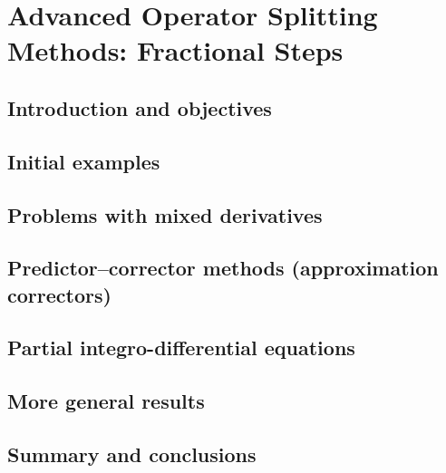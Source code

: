 \chapter{Advanced Operator Splitting Methods: Fractional Steps}

\section{Introduction and objectives}

\section{Initial examples}

\section{Problems with mixed derivatives}

\section{Predictor–corrector methods (approximation correctors)}

\section{Partial integro-differential equations}

\section{More general results}

\section{Summary and conclusions}